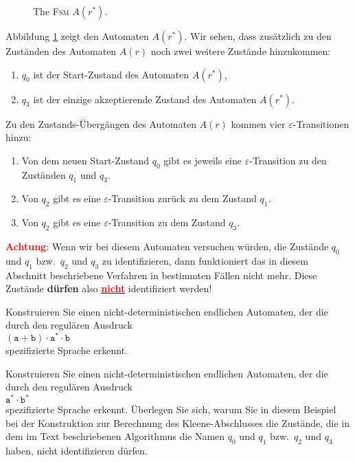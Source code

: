 \begin{enumerate}
      \begin{figure}[!ht]
        \centering
      \caption{The \textsc{Fsm} $A(r^*)$.}
      \label{fig:aStar.eps}
      \end{figure}
      Abbildung \ref{fig:aStar.eps} zeigt den Automaten $A(r^*)$.
      Wir sehen, dass zus\"atzlich zu den Zust\"anden des  Automaten $A(r)$ 
      noch zwei weitere Zust\"ande hinzukommen:
      \begin{enumerate}
      \item $q_0$ ist der Start-Zustand des Automaten $A(r^*)$,
      \item $q_3$ ist der einzige akzeptierende Zustand des Automaten $A(r^*)$.
      \end{enumerate}
      Zu den Zustands-\"Uberg\"angen des Automaten $A(r)$  kommen 
      vier $\varepsilon$-Transitionen hinzu: 
      \begin{enumerate}
      \item Von dem neuen Start-Zustand $q_0$ gibt es jeweils eine
            $\varepsilon$-Transition zu den Zust\"anden $q_1$ und $q_3$.
      \item Von $q_2$ gibt es eine  $\varepsilon$-Transition zur\"uck zu dem
            Zustand $q_1$.
      \item Von $q_2$ gibt es eine  $\varepsilon$-Transition zu dem
            Zustand $q_3$.
      \end{enumerate}
      \textbf{\textcolor{red}{Achtung}}:  Wenn wir bei diesem Automaten versuchen w\"urden, die Zust\"ande
      $q_0$ und $q_1$ bzw.~$q_2$ und $q_3$ zu identifizieren, dann funktioniert das in 
      diesem Abschnitt beschriebene Verfahren in bestimmten  F\"allen nicht mehr.  Diese
      Zust\"ande \textbf{d\"urfen} also \underline{\textbf{\textcolor{red}{nicht}}} identifiziert werden!
\end{enumerate}

\exercise
Konstruieren Sie einen nicht-deterministischen endlichen Automaten, der die durch
den regul\"aren Ausdruck
\\[0.2cm]
\hspace*{1.3cm}
$(\texttt{a} + \texttt{b}) \cdot \texttt{a}^* \cdot \texttt{b}$
\\[0.2cm]
spezifizierte Sprache erkennt.

\exerciseStar
Konstruieren Sie einen nicht-deterministischen endlichen Automaten, der die durch
den regul\"aren Ausdruck
\\[0.2cm]
\hspace*{1.3cm}
$\texttt{a}^* \cdot \texttt{b}^*$
\\[0.2cm]
spezifizierte Sprache erkennt.  \"Uberlegen Sie sich, warum Sie in diesem Beispiel bei der Konstruktion zur
Berechnung des Kleene-Abschlusses die Zust\"ande, die in dem im Text beschriebenen
Algorithmus die Namen $q_0$ und $q_1$ bzw.~$q_2$ und $q_3$ haben, nicht identifizieren
d\"urfen.


